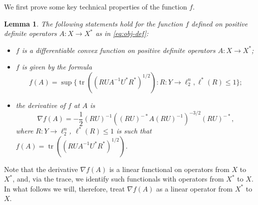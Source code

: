 \documentclass[11pt]{article}
\newtheorem{lemma}[theorem]{Lemma}
\DeclareMathOperator{\tr}{tr}
\begin{document}
We first prove some key technical properties of the function $f$.
\begin{lemma}\label{lm:obj-f}
  The following statements hold for the function $f$ defined on
  positive definite operators $A:X \to X^*$ as in \eqref{eq:obj-def}:
 \begin{itemize}
  \item $f$ is a differentiable convex function on positive definite
    operators $A:X \to X^*$;
  \item $f$ is given by the formula
    \begin{equation}\label{eq:f-formula}
    f(A) = \sup\{\tr((RUA^{-1}U^*R^*)^{1/2}): 
    R: Y \to \ell_2^n, \ell^*(R) \le 1\};
    \end{equation}
  \item the derivative of $f$ at $A$ is 
    \begin{equation}\label{eq:f-derivative}
    \nabla f(A) = 
    -\frac{1}{2} (RU)^{-1} ((RU)^{-*} A (RU)^{-1})^{-3/2} (RU)^{-*},
    \end{equation}
    where $R: Y \to \ell_2^n$, $\ell^*(R) \le 1$ is such that $f(A) = 
    \tr((RUA^{-1}U^*R^*)^{1/2})$.
  \end{itemize}
\end{lemma}
Note that the derivative $\nabla f(A)$ is a linear functional on
operators from $X$ to $X^*$, and, via the trace, we identify such functionals with
operators from $X^*$ to $X$. In what follows we will, therefore, treat $\nabla
f(A)$ as a linear operator from $X^*$ to $X$.
\end{document}
